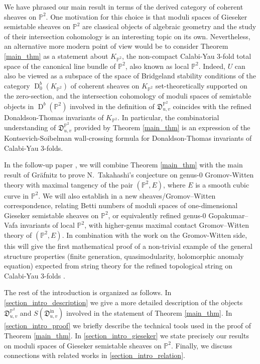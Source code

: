 \documentclass[12pt, a4paper]{amsart}
\newcommand\PP{\mathbb P}
\newcommand\fD{\mathfrak D}
\newcommand\D{\operatorname{D}}
\newcommand\iin{\mathrm{in}}
\begin{document}
We have phrased our main result in terms of the derived category of coherent sheaves on 
$\PP^2$. One motivation for this choice is that moduli spaces of Gieseker semistable sheaves on $\PP^2$ are classical objects of algebraic geometry and the study of their intersection cohomology is an interesting topic on its own. Nevertheless, an alternative 
more modern point of view would be to consider Theorem \ref{main_thm} as a statement about $K_{\PP^2}$, the non-compact Calabi-Yau 3-fold total space of the canonical line bundle of $\PP^2$, also known as local $\PP^2$. Indeed, $U$ can also be viewed as a subspace of the space of Bridgeland stability conditions of the category $\D^b_0(K_{\PP^2})$ of coherent sheaves on $K_{\PP^2}$
set-theoretically supported on the zero-section, and the intersection cohomology of moduli spaces of semistable objects in $\D^b(\PP^2)$ involved in the definition of $\fD_{u,v}^{\PP^2}$ coincides with the refined Donaldson-Thomas invariants of $K_{\PP^2}$.
In particular, the combinatorial understanding of $\fD_{u,v}^{\PP^2}$
provided by Theorem \ref{main_thm} is an expression of the Kontsevich-Soibelman  wall-crossing formula \cite{kontsevich2008stability} for Donaldson-Thomas invariants of Calabi-Yau 3-folds.

In the follow-up paper \cite{bousseau2019takahashi}, we will combine Theorem \ref{main_thm} with the main result of 
Gr\"afnitz \cite{gabele2019tropical} to prove 
N.\ Takahashi's conjecture
\cite{MR1844627, choi2018log} on genus-$0$ Gromov-Witten theory with maximal tangency of the pair $(\PP^2,E)$, where $E$ is a smooth cubic curve in $\PP^2$.
We 
will also establish in \cite{bousseau2019takahashi} a new
sheaves/Gromov--Witten correspondence, relating Betti numbers of moduli spaces of one-dimensional Gieseker semistable sheaves on $\PP^2$, or equivalently refined genus-$0$ Gopakumar--Vafa invariants of local $\PP^2$,
with higher-genus maximal contact Gromov--Witten theory of $(\PP^2,E)$.
In combination with the work \cite{bousseau2020hae} on the Gromov-Witten side,
this will give the first mathematical proof of a non-trivial example of the general structure properties (finite generation, quasimodularity, holomorphic anomaly equation)
expected from string theory for the refined topological string on Calabi-Yau 3-folds
\cite{MR3024275}.

The rest of the introduction is organized as follows. 
In \cref{section_intro_description} we give a more detailed description of the objects 
$\fD_{u,v}^{\PP^2}$ and $S(\fD^\iin_{u,v})$
involved in the statement of Theorem
\ref{main_thm}. 
In \cref{section_intro_proof} we briefly describe the technical tools used in the proof of Theorem \ref{main_thm}. 
In \cref{section_intro_gieseker} 
we state precisely our results on moduli spaces of Gieseker semistable sheaves on 
$\PP^2$. 
Finally, we discuss connections with related works in \cref{section_intro_relation}.
\end{document}

